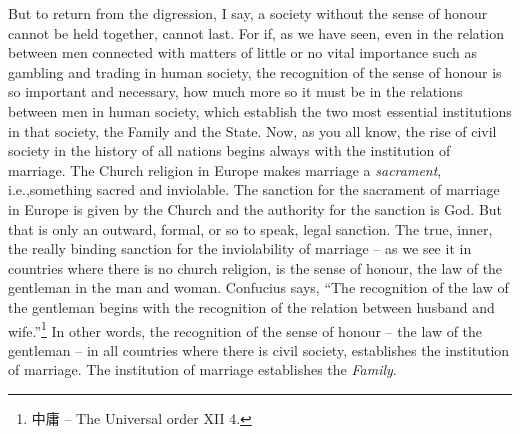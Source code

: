 But to return from the digression, I say, a society without the sense of honour cannot be held together, cannot last. For if, as we have seen, even in the relation between men connected with matters of little or no vital importance such as gambling and trading in human society, the recognition of the sense of honour is so important and necessary, how much more so it must be in the relations between men in human society, which establish the two most essential institutions in that society, the Family and the State. Now, as you all know, the rise of civil society in the history of all nations begins always with the institution of marriage. The Church religion in Europe makes marriage a \emph{sacrament}, i.e.,something sacred and inviolable. The sanction for the sacrament of marriage in Europe is given by the Church and the authority for the sanction is God. But that is only an outward, formal, or so to speak, legal sanction. The true, inner, the really binding sanction for the inviolability of marriage -- as we see it in countries where there is no church religion, is the sense of honour, the law of the gentleman in the man and woman. Confucius says, ``The recognition of the law of the gentleman begins with the recognition of the relation between husband and wife.''\footnote{中庸 -- The Universal order XII 4.}
In other words, the recognition of the sense of honour -- the law of the gentleman -- in all countries where there is civil society, establishes the institution of marriage. The institution of marriage establishes the \emph{Family}.

